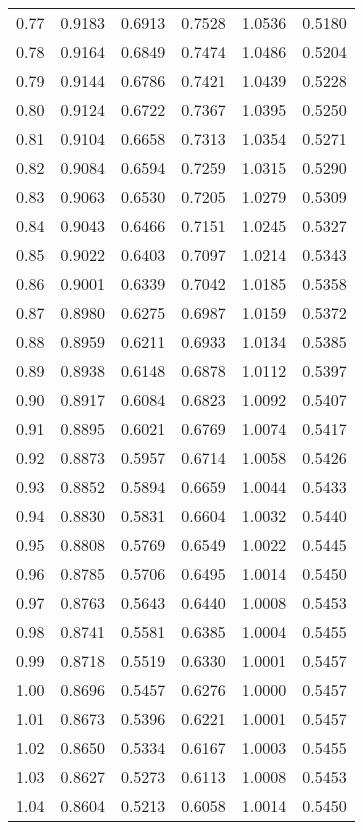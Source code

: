 \documentclass{article}
\begin{document}
\begin{longtable}{cccccc}
0.77 & 0.9183 & 0.6913 & 0.7528 & 1.0536 & 0.5180 \\
0.78 & 0.9164 & 0.6849 & 0.7474 & 1.0486 & 0.5204 \\
0.79 & 0.9144 & 0.6786 & 0.7421 & 1.0439 & 0.5228 \\
0.80 & 0.9124 & 0.6722 & 0.7367 & 1.0395 & 0.5250 \\
0.81 & 0.9104 & 0.6658 & 0.7313 & 1.0354 & 0.5271 \\
0.82 & 0.9084 & 0.6594 & 0.7259 & 1.0315 & 0.5290 \\
0.83 & 0.9063 & 0.6530 & 0.7205 & 1.0279 & 0.5309 \\
0.84 & 0.9043 & 0.6466 & 0.7151 & 1.0245 & 0.5327 \\
0.85 & 0.9022 & 0.6403 & 0.7097 & 1.0214 & 0.5343 \\
0.86 & 0.9001 & 0.6339 & 0.7042 & 1.0185 & 0.5358 \\
0.87 & 0.8980 & 0.6275 & 0.6987 & 1.0159 & 0.5372 \\
0.88 & 0.8959 & 0.6211 & 0.6933 & 1.0134 & 0.5385 \\
0.89 & 0.8938 & 0.6148 & 0.6878 & 1.0112 & 0.5397 \\
0.90 & 0.8917 & 0.6084 & 0.6823 & 1.0092 & 0.5407 \\
0.91 & 0.8895 & 0.6021 & 0.6769 & 1.0074 & 0.5417 \\
0.92 & 0.8873 & 0.5957 & 0.6714 & 1.0058 & 0.5426 \\
0.93 & 0.8852 & 0.5894 & 0.6659 & 1.0044 & 0.5433 \\
0.94 & 0.8830 & 0.5831 & 0.6604 & 1.0032 & 0.5440 \\
0.95 & 0.8808 & 0.5769 & 0.6549 & 1.0022 & 0.5445 \\
0.96 & 0.8785 & 0.5706 & 0.6495 & 1.0014 & 0.5450 \\
0.97 & 0.8763 & 0.5643 & 0.6440 & 1.0008 & 0.5453 \\
0.98 & 0.8741 & 0.5581 & 0.6385 & 1.0004 & 0.5455 \\
0.99 & 0.8718 & 0.5519 & 0.6330 & 1.0001 & 0.5457 \\
1.00 & 0.8696 & 0.5457 & 0.6276 & 1.0000 & 0.5457 \\
1.01 & 0.8673 & 0.5396 & 0.6221 & 1.0001 & 0.5457 \\
1.02 & 0.8650 & 0.5334 & 0.6167 & 1.0003 & 0.5455 \\
1.03 & 0.8627 & 0.5273 & 0.6113 & 1.0008 & 0.5453 \\
1.04 & 0.8604 & 0.5213 & 0.6058 & 1.0014 & 0.5450 \\

\end{longtable}
\end{document}
